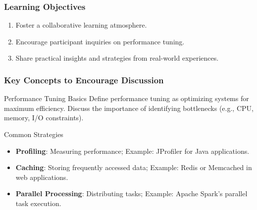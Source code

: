 \documentclass[aspectratio=169]{beamer}
\begin{document}
\begin{frame}[fragile]
    \frametitle{Learning Objectives}
    \begin{enumerate}
        \item Foster a collaborative learning atmosphere.
        \item Encourage participant inquiries on performance tuning.
        \item Share practical insights and strategies from real-world experiences.
    \end{enumerate}
\end{frame}

\begin{frame}[fragile]
    \frametitle{Key Concepts to Encourage Discussion}
    \begin{block}{Performance Tuning Basics}
        Define performance tuning as optimizing systems for maximum efficiency.
        Discuss the importance of identifying bottlenecks (e.g., CPU, memory, I/O constraints).
    \end{block}
    
    \begin{block}{Common Strategies}
        \begin{itemize}
            \item \textbf{Profiling}: Measuring performance; Example: JProfiler for Java applications.
            \item \textbf{Caching}: Storing frequently accessed data; Example: Redis or Memcached in web applications.
            \item \textbf{Parallel Processing}: Distributing tasks; Example: Apache Spark's parallel task execution.
        \end{itemize}
    \end{block}
\end{frame}
\end{document}
